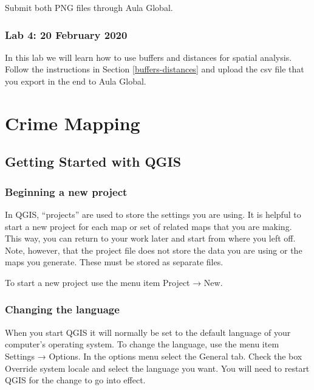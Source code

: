 \documentclass[]{book}
\begin{document}
Submit both PNG files through Aula Global.

\hypertarget{lab-4-20-february-2020}{%
\section*{Lab 4: 20 February 2020}\label{lab-4-20-february-2020}}

In this lab we will learn how to use buffers and distances for spatial analysis. Follow the instructions in Section \ref{buffers-distances} and upload the csv file that you export in the end to Aula Global.

\hypertarget{part-crime-mapping}{%
\part{Crime Mapping}\label{part-crime-mapping}}

\hypertarget{getting-started-with-qgis}{%
\chapter{Getting Started with QGIS}\label{getting-started-with-qgis}}

\hypertarget{beginning-a-new-project}{%
\section{Beginning a new project}\label{beginning-a-new-project}}

In QGIS, ``projects'' are used to store the settings you are using. It is helpful to start a new project for each map or set of related maps that you are making. This way, you can return to your work later and start from where you left off. Note, however, that the project file does not store the data you are using or the maps you generate. These must be stored as separate files.

To start a new project use the menu item Project → New.

\hypertarget{changing-the-language}{%
\section{Changing the language}\label{changing-the-language}}

When you start QGIS it will normally be set to the default language of your computer's operating system. To change the language, use the menu item Settings → Options. In the options menu select the General tab. Check the box Override system locale and select the language you want. You will need to restart QGIS for the change to go into effect.
\end{document}
